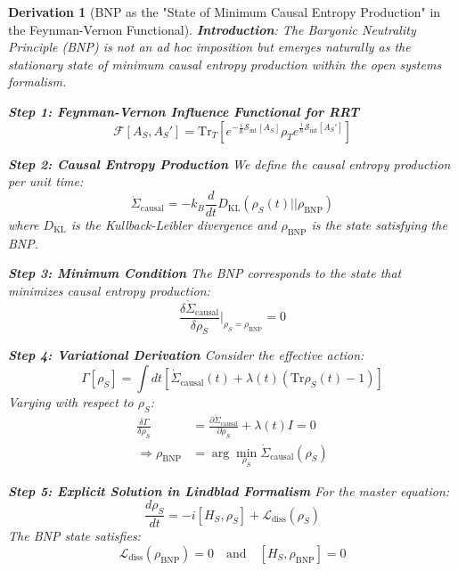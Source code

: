 \documentclass[10pt, a4paper]{article}
\newcommand{\Tr}{\text{Tr}}
\newtheorem{derivation}{Derivation}
\begin{document}
\begin{derivation}[BNP as the "State of Minimum Causal Entropy Production" in the Feynman-Vernon Functional]
\textbf{Introduction}: The Baryonic Neutrality Principle (BNP) is not an ad hoc imposition but emerges naturally as the stationary state of minimum causal entropy production within the open systems formalism.

\textbf{Step 1: Feynman-Vernon Influence Functional for RRT}
\begin{equation}
\mathcal{F}[A_S, A_S'] = \Tr_T \left[ e^{-\frac{i}{\hbar} \mathcal{S}_{\text{int}}[A_S]} \rho_T e^{\frac{i}{\hbar} \mathcal{S}_{\text{int}}[A_S']} \right]
\tag{3.1}
\end{equation}

\textbf{Step 2: Causal Entropy Production}
We define the causal entropy production per unit time:
\begin{equation}
\dot{\Sigma}_{\text{causal}} = -k_B \frac{d}{dt} D_{\text{KL}}(\rho_S(t) || \rho_{\text{BNP}})
\tag{3.2}
\end{equation}
where $D_{\text{KL}}$ is the Kullback-Leibler divergence and $\rho_{\text{BNP}}$ is the state satisfying the BNP.

\textbf{Step 3: Minimum Condition}
The BNP corresponds to the state that minimizes causal entropy production:
\begin{equation}
\frac{\delta \dot{\Sigma}_{\text{causal}}}{\delta \rho_S} \bigg|_{\rho_S = \rho_{\text{BNP}}} = 0
\tag{3.3}
\end{equation}

\textbf{Step 4: Variational Derivation}
Consider the effective action:
\begin{equation}
\Gamma[\rho_S] = \int dt \left[ \dot{\Sigma}_{\text{causal}}(t) + \lambda(t)(\Tr\rho_S(t) - 1) \right]
\tag{3.4}
\end{equation}
Varying with respect to $\rho_S$:
\begin{align}
\frac{\delta \Gamma}{\delta \rho_S} &= \frac{\partial \dot{\Sigma}_{\text{causal}}}{\partial \rho_S} + \lambda(t) I = 0
\tag{3.5} \\
\Rightarrow \rho_{\text{BNP}} &= \arg\min_{\rho_S} \dot{\Sigma}_{\text{causal}}(\rho_S)
\tag{3.6}
\end{align}

\textbf{Step 5: Explicit Solution in Lindblad Formalism}
For the master equation:
\begin{equation}
\frac{d\rho_S}{dt} = -i[H_S, \rho_S] + \mathcal{L}_{\text{diss}}(\rho_S)
\tag{3.7}
\end{equation}
The BNP state satisfies:
\begin{equation}
\mathcal{L}_{\text{diss}}(\rho_{\text{BNP}}) = 0 \quad \text{and} \quad [H_S, \rho_{\text{BNP}}] = 0
\tag{3.8}
\end{equation}


\end{derivation}
\end{document}

